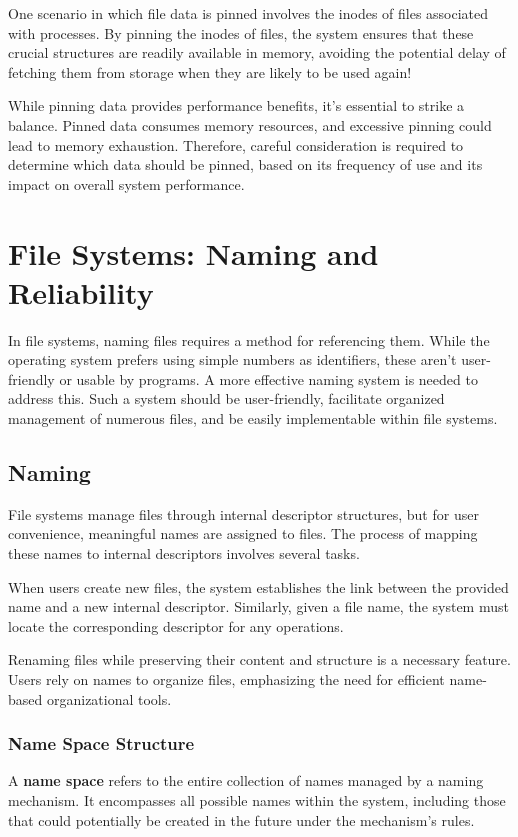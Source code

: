 \documentclass{report}
\newcommand{\definitionBegin}[1]{\begin{tcolorbox}[title={Definition: #1}]}
\newcommand{\definitionEnd}{\end{tcolorbox}}
\newcommand{\exampleBegin}[1]{\begin{tcolorbox}[colback=blue!5!white,colframe=black!75!blue,title={Example:
      #1}]}
\newcommand{\exampleEnd}{\end{tcolorbox}}
\begin{document}
\exampleBegin{Pinned Down}
One scenario in which file data is pinned involves the inodes of files associated with processes. By
pinning the inodes of files, the system ensures that these crucial structures are readily available
in memory, avoiding the potential delay of fetching them from storage when they are likely to be
used again!
\exampleEnd

While pinning data provides performance benefits, it's essential to strike a balance. Pinned data
consumes memory resources, and excessive pinning could lead to memory exhaustion. Therefore, careful
consideration is required to determine which data should be pinned, based on its frequency of use
and its impact on overall system performance. 





\chapter{File Systems: Naming and Reliability}
In file systems, naming files requires a method for referencing them. While the operating system
prefers using simple numbers as identifiers, these aren't user-friendly or usable by programs. A
more effective naming system is needed to address this. Such a system should be user-friendly,
facilitate organized management of numerous files, and be easily implementable within file systems. 




\section{Naming}
File systems manage files through internal descriptor structures, but for user convenience,
meaningful names are assigned to files. The process of mapping these names to internal descriptors
involves several tasks.

When users create new files, the system establishes the link between the provided name and a new
internal descriptor. Similarly, given a file name, the system must locate the corresponding
descriptor for any operations.

Renaming files while preserving their content and structure is a necessary feature. Users rely on
names to organize files, emphasizing the need for efficient name-based organizational tools.


\subsection{Name Space Structure}
\definitionBegin{Name Space}
A \textbf{name space} refers to the entire collection of names managed by a naming mechanism. It
encompasses all possible names within the system, including those that could potentially be created
in the future under the mechanism's rules.
\definitionEnd
\end{document}
